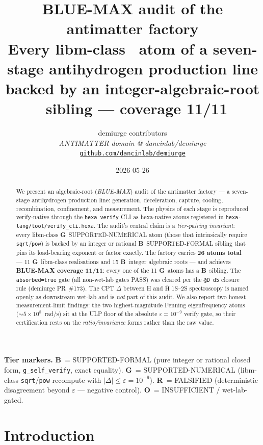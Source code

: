 \documentclass[11pt,a4paper]{article}
\title{
  \textbf{BLUE-MAX audit of the antimatter factory}\\[5pt]
  \large Every libm-class \tierGreen\ atom of a seven-stage antihydrogen
  production line backed by an integer-algebraic-root \tierBlue\ sibling
  --- coverage 11/11
}
\author{
  demiurge contributors\\
  \normalsize\textit{ANTIMATTER domain @ dancinlab/demiurge}\\[2pt]
  \normalsize\href{https://github.com/dancinlab/demiurge}{\texttt{github.com/dancinlab/demiurge}}
}
\date{2026-05-26}
\newcommand{\tierBlue}{\textbf{B}}
\newcommand{\tierGreen}{\textbf{G}}
\newcommand{\tierRed}{\textbf{R}}
\newcommand{\tierOrange}{\textbf{O}}
\begin{document}
\maketitle

\begin{abstract}
\noindent
We present an algebraic-root (\emph{BLUE-MAX}) audit of the antimatter
factory --- a seven-stage antihydrogen production line: generation,
deceleration, capture, cooling, recombination, confinement, and
measurement. The physics of each stage is reproduced verify-native through
the \texttt{hexa verify} CLI as hexa-native atoms registered in
\texttt{hexa-lang/tool/verify\_cli.hexa}. The audit's central claim is a
\emph{tier-pairing invariant}: every libm-class \tierGreen\
SUPPORTED-NUMERICAL atom (those that intrinsically require
\texttt{sqrt}/\texttt{pow}) is backed by an integer or rational
\tierBlue\ SUPPORTED-FORMAL sibling that pins its load-bearing exponent or
factor exactly. The factory carries \textbf{26 atoms total} --- 11
\tierGreen\ libm-class realisations and 15 \tierBlue\ integer
algebraic roots --- and achieves \textbf{BLUE-MAX coverage 11/11}: every
one of the 11 \tierGreen\ atoms has a \tierBlue\ sibling. The
\texttt{absorbed=true} gate (all non-wet-lab gates PASS) was cleared per the
\texttt{@D~d5} closure rule (demiurge PR~\#173). The CPT $\Delta$ between H
and $\overline{\text{H}}$ 1S--2S spectroscopy is named openly as
downstream wet-lab and is \emph{not} part of this audit. We also report two
honest measurement-limit findings: the two highest-magnitude Penning
eigenfrequency atoms ($\sim\!5\times10^{8}$~rad/s) sit at the ULP floor of
the absolute $\varepsilon=10^{-9}$ verify gate, so their certification rests
on the \emph{ratio/invariance} forms rather than the raw value.
\end{abstract}

\noindent\textbf{Tier markers.} \tierBlue\ = SUPPORTED-FORMAL (pure integer
or rational closed form, \texttt{g\_self\_verify}, exact equality).
\tierGreen\ = SUPPORTED-NUMERICAL (libm-class \texttt{sqrt}/\texttt{pow}
recompute with $|\Delta|\le\varepsilon=10^{-9}$). \tierRed\ = FALSIFIED
(deterministic disagreement beyond $\varepsilon$ --- negative control).
\tierOrange\ = INSUFFICIENT / wet-lab-gated.

\section{Introduction}
\label{sec:intro}
\end{document}
